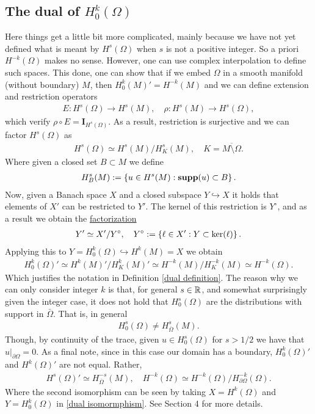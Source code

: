 \documentclass[12pt]{article}
\theoremstyle{definition}
\newcommand{\Id}{\mathbf{I}}\renewcommand{\ker}{\mathbf{ker}}\newcommand{\supp}[1]{\mathbf{supp}(#1)}\renewcommand{\tr}[1]{\mathrm{tr}\left(#1\right)}
\newcommand\restr[2]{\left.#1\right|_{#2}}
\begin{document}
\subsection{The dual of $H^k_0(\Omega)$}
Here things get a little bit more complicated, mainly because we have not yet defined what is meant by
$H^s(\Omega)$ when $s$ is not a positive integer. So a priori $H^{-k}(\Omega)$ makes no sense. However, one can use complex interpolation to define such spaces. This done, one can show that if we embed $\Omega$ in a smooth manifold (without boundary) $M$, then $H_0^k(M)'=H^{-k}(M)$ and we can define extension and restriction operators
\begin{align*}
	E:H^s(\Omega ) \to H^s(M), \quad \rho: H^s(M) \to H^s(\Omega ),
\end{align*}
which verify $\rho \circ E = \Id_{H^s(\Omega )}$. As a result, restriction is surjective and we can factor $H^s(\Omega )$ as
\begin{align}\label{ismorphism}
	H^s(\Omega )\simeq H^s(M)\slash H^s_K(M ), \quad K=\overline{M\setminus \Omega }.
\end{align}
Where given a closed set $B\subset M$ we define
\begin{align*}
	H^s_B(M):= \set{u \in H^s(M): \supp{u} \subset B}.
\end{align*}
Now, given a Banach space $X$ and a closed subspace $Y \hookrightarrow X$ it holds that elements of $X'$ can be restricted to $Y'$. The kernel of this restriction is $Y^\circ$, and as a result we obtain the \href{https://math.la.asu.edu/~quigg/teach/courses/578/2008/notes/adjoints.pdf}{factorization}
\begin{align}\label{dual isomormphism}
	Y' \simeq X'\slash Y^\circ, \quad Y^\circ:= \left\{\ell \in X': Y \subset \rm{ker}(\ell)\right\}.
\end{align}
Applying this to $Y= H^k_0(\Omega )\hookrightarrow H^k(M) =X$ we obtain
\begin{align*}
	H^{k}_0(\Omega )' \simeq H^{k}(M)'\slash H^{k}_K(M)'\simeq H^{-k}(M)\slash H^{-k}_K(M )\simeq H^{-k}(\Omega ).
\end{align*}
Which justifies the notation in Definition \ref{dual definition}. The reason why we can only consider
integer $k$ is that, for general $s \in \mathbb{R}$, and somewhat surprisingly given the integer case, it does not hold that $H^s_0(\Omega )$ are the distributions with support in $\bar{\Omega}$. That is, in general
\begin{align*}
	H^s_0(\Omega )\neq H^{s}_{\overline{\Omega } }(M).
\end{align*}
Though, by continuity of the trace, given  $ u \in H^s_0(\Omega )$ for $s>1/2$ we have that $\restr{u}{\partial \Omega } =0$.
As a final note, since in this case our domain has a boundary, $H_0^k(\Omega )'$ and $H^k(\Omega )'$ are not equal. Rather,
\begin{align*}
	H^s(\Omega )'\simeq H_{\overline{\Omega } }^{-s}(M), \quad H^{-k}(\Omega ) \simeq H^{-k}(\Omega )\slash H_{\partial \Omega }^{-k}(\Omega ).
\end{align*}
Where the second isomorphism can be seen by taking $X=H^k(\Omega )$ and $Y=H^k_{0 }(\Omega )$ in \eqref{dual isomormphism}. See \cite{taylor2013partial} Section 4 for more details.
\end{document}

